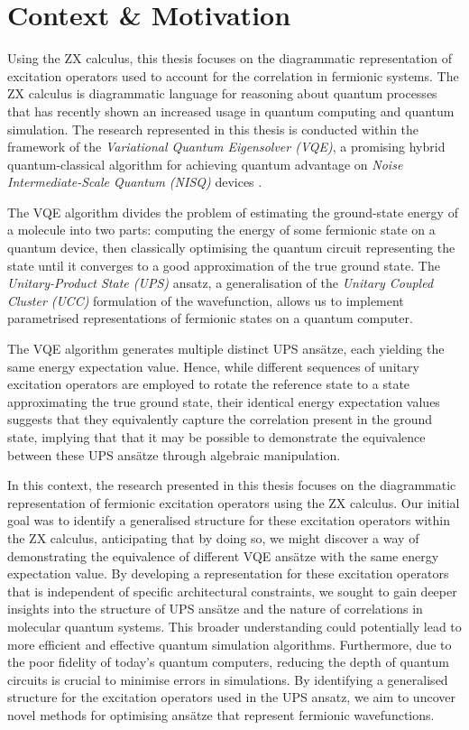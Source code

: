 \section{Context \& Motivation}%
\label{context-motivation}

Using the ZX calculus, this thesis focuses on the diagrammatic representation of excitation operators used to account for the correlation in fermionic systems. The ZX calculus is diagrammatic language for reasoning about quantum processes \cite{Coecke2011} that has recently shown an increased usage in quantum computing and quantum simulation. The research represented in this thesis is conducted within the framework of the \textit{Variational Quantum Eigensolver (VQE)}, a promising hybrid quantum-classical algorithm for achieving quantum advantage on \textit{Noise Intermediate-Scale Quantum (NISQ)} devices \cite{Cerezo2020}.

The VQE algorithm divides the problem of estimating the ground-state energy of a molecule into two parts: computing the energy of some fermionic state on a quantum device, then classically optimising the quantum circuit representing the state until it converges to a good approximation of the true ground state. The \textit{Unitary-Product State (UPS)} ansatz, a generalisation of the \textit{Unitary Coupled Cluster (UCC)} formulation of the wavefunction, allows us to implement parametrised representations of fermionic states on a quantum computer.

The VQE algorithm generates multiple distinct UPS ansätze, each yielding the same energy expectation value. Hence, while different sequences of unitary excitation operators are employed to rotate the reference state to a state approximating the true ground state, their identical energy expectation values suggests that they equivalently capture the correlation present in the ground state, implying that that it may be possible to demonstrate the equivalence between these UPS ansätze through algebraic manipulation.

In this context, the research presented in this thesis focuses on the diagrammatic representation of fermionic excitation operators using the ZX calculus. Our initial goal was to identify a generalised structure for these excitation operators within the ZX calculus, anticipating that by doing so, we might discover a way of demonstrating the equivalence of different VQE ansätze with the same energy expectation value. By developing a representation for these excitation operators that is independent of specific architectural constraints, we sought to gain deeper insights into the structure of UPS ansätze and the nature of correlations in molecular quantum systems. This broader understanding could potentially lead to more efficient and effective quantum simulation algorithms. Furthermore, due to the poor fidelity of today's quantum computers, reducing the depth of quantum circuits is crucial to minimise errors in simulations. By identifying a generalised structure for the excitation operators used in the UPS ansatz, we aim to uncover novel methods for optimising ansätze that represent fermionic wavefunctions.

